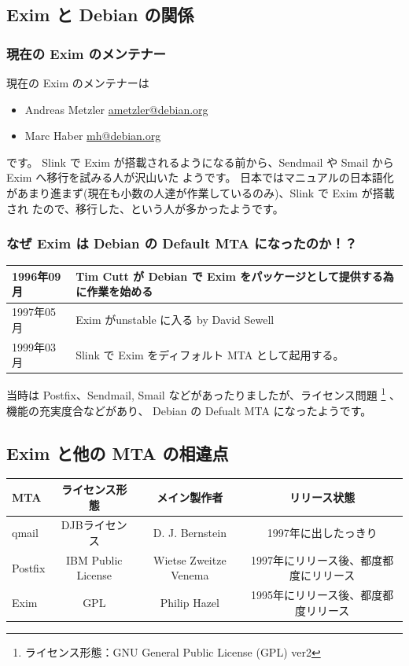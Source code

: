 \documentclass[mingoth,a4paper]{jsarticle}
\begin{document}
\subsection{Exim と Debian の関係}
\subsubsection{現在の Exim のメンテナー}
現在の Exim のメンテナーは
\begin{itemize}
\item Andreas Metzler  \url{ametzler@debian.org}
\item Marc Haber \url{mh@debian.org}
\end{itemize}
です。
Slink で Exim が搭載されるようになる前から、Sendmail や Smail から Exim へ移行を試みる人が沢山いた
ようです。
日本ではマニュアルの日本語化があまり進まず(現在も小数の人達が作業しているのみ)、Slink で Exim が搭載され
たので、移行した、という人が多かったようです。

\subsubsection{なぜ Exim は Debian の Default MTA になったのか！？}

\begin{tabular}[htb]{|l|l|} \hline
1996年09月 & Tim Cutt が Debian で Exim をパッケージとして提供する為に作業を始める \\ \hline
1997年05月 & Exim がunstable に入る by David Sewell \\ \hline
1999年03月 & Slink で Exim をディフォルト MTA として起用する。\\ \hline
\end{tabular}

当時は Postfix、Sendmail, Smail などがあったりましたが、ライセンス問題
\footnote{ライセンス形態：GNU General Public License (GPL)  ver2}
、機能の充実度合などがあり、
Debian の Defualt MTA になったようです。

\subsection{Exim と他の MTA の相違点}

\begin{tabular}[htb]{|l|ccc|} \hline
MTA&ライセンス形態 & メイン製作者 & リリース状態 \\ \hline
qmail&DJBライセンス&D. J. Bernstein& 1997年に出したっきり\\ \hline
Postfix&IBM Public License&Wietse Zweitze Venema&1997年にリリース後、都度都度にリリース \\ \hline
Exim&GPL&Philip Hazel&1995年にリリース後、都度都度リリース \\ \hline
\end{tabular}
\end{document}
